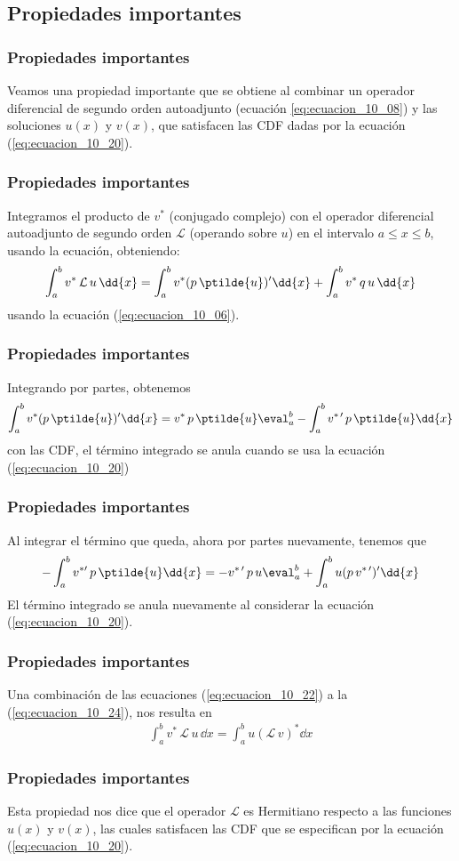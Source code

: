 \subsection{Propiedades importantes}
\begin{frame}
\frametitle{Propiedades importantes}
Veamos una propiedad importante que se obtiene al combinar un operador diferencial de segundo orden autoadjunto (ecuación \ref{eq:ecuacion_10_08}) y las soluciones $u(x)$ y $v(x)$, que satisfacen las CDF dadas por la ecuación (\ref{eq:ecuacion_10_20}).
\end{frame}
\begin{frame}
\frametitle{Propiedades importantes}
Integramos el producto de $v^{*}$ (conjugado complejo) con el operador diferencial autoadjunto de segundo orden $\mathcal{L}$ (operando sobre $u$) en el intervalo $a \leq x \leq b$, usando la ecuación, obteniendo:
{\fontsize{12}{12}\selectfont
\begin{align}
\int_{a}^{b} v^{*} \, \mathcal{L} \, u \, \dd{x} = \int_{a}^{b} v^{*} (p \, \ptilde{u})^{\prime} \dd{x} + \int_{a}^{b} v^{*} \, q \, u \, \dd{x}
\label{eq:ecuacion_10_22}
\end{align}}
usando la ecuación (\ref{eq:ecuacion_10_06}).
\end{frame}
\begin{frame}
\frametitle{Propiedades importantes}
Integrando por partes, obtenemos
\begin{align}
\int_{a}^{b} v^{*}(p \, \ptilde{u})^{\prime} \dd{x} = v^{*} \, p \, \ptilde{u} \eval_{a}^{b} - \int_{a}^{b} v^{* \, \prime} \, p \, \ptilde{u} \dd{x}
\label{eq:ecuacion_10_23}
\end{align}
con las CDF, el término integrado se anula cuando se usa la ecuación (\ref{eq:ecuacion_10_20})
\end{frame}
\begin{frame}
\frametitle{Propiedades importantes}
Al integrar el término que queda, ahora por partes nuevamente, tenemos que
\begin{align}
- \int_{a}^{b} v^{* \prime} \, p \, \ptilde{u} \dd{x} = - v^{* \, \prime} \, p \, u \eval_{a}^{b} + \int_{a}^{b} u(p \, v^{* \, \prime})^{\prime} \dd{x}
\label{eq:ecuacion_10_24}
\end{align}
El término integrado se anula nuevamente al considerar la ecuación (\ref{eq:ecuacion_10_20}).
\end{frame}
\begin{frame}
\frametitle{Propiedades importantes}
Una combinación de las ecuaciones (\ref{eq:ecuacion_10_22}) a la (\ref{eq:ecuacion_10_24}), nos resulta en
\begin{align}
\int_{a}^{b} v^{*} \, \mathcal{L} \, u \, \dd{x} = \int_{a}^{b} u (\mathcal{L}  \, v)^{*} \dd{x}
\label{eq:ecuacion_10_25}
\end{align}
\end{frame}
\begin{frame}
\frametitle{Propiedades importantes}
Esta propiedad nos dice que el operador $\mathcal{L}$ es Hermitiano respecto a las funciones $u(x)$ y $v(x)$, las cuales satisfacen las CDF que se especifican por la ecuación (\ref{eq:ecuacion_10_20}).
\end{frame}
